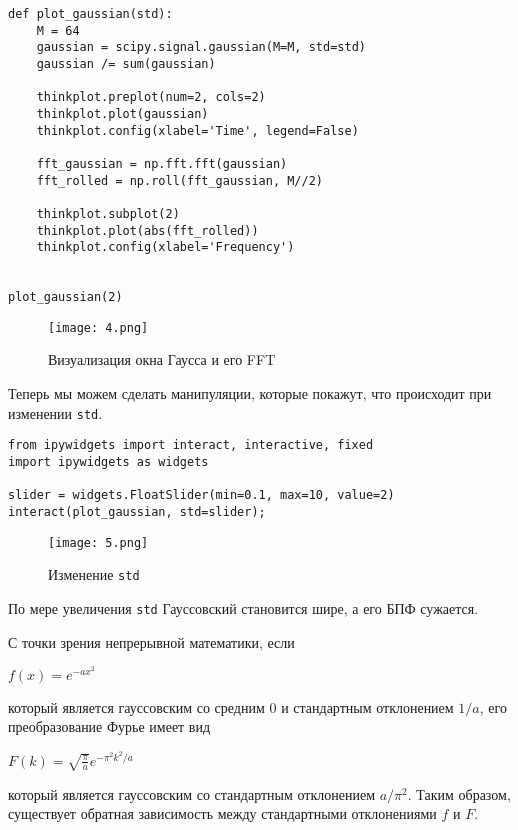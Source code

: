 \documentclass[a4paper,12pt]{report}
\begin{document}
\begin{lstlisting}[caption=Функция \texttt{plot\_gaussian}]
def plot_gaussian(std):
    M = 64
    gaussian = scipy.signal.gaussian(M=M, std=std)
    gaussian /= sum(gaussian)
    
    thinkplot.preplot(num=2, cols=2)
    thinkplot.plot(gaussian)
    thinkplot.config(xlabel='Time', legend=False)

    fft_gaussian = np.fft.fft(gaussian)
    fft_rolled = np.roll(fft_gaussian, M//2)
    
    thinkplot.subplot(2)
    thinkplot.plot(abs(fft_rolled))
    thinkplot.config(xlabel='Frequency')

    
plot_gaussian(2)
\end{lstlisting}

\begin{figure}[H]
        \centering
        \texttt{[image: 4.png]}
        \caption{Визуализация окна Гаусса и его FFT}
        \label{fig:lab8_fig2_4}
\end{figure}

Теперь мы можем сделать манипуляции, которые покажут, что происходит при изменении \texttt{std}.

\begin{lstlisting}[caption=Изменение \texttt{std}]
from ipywidgets import interact, interactive, fixed
import ipywidgets as widgets

slider = widgets.FloatSlider(min=0.1, max=10, value=2)
interact(plot_gaussian, std=slider);
\end{lstlisting}

\begin{figure}[H]
        \centering
        \texttt{[image: 5.png]}
        \caption{Изменение \texttt{std}}
        \label{fig:lab8_fig2_5}
\end{figure}

По мере увеличения \texttt{std} Гауссовский становится шире, а его БПФ сужается.

С точки зрения непрерывной математики, если

$f(x) = e^{-a x^2}$

который является гауссовским со средним 0 и стандартным отклонением $1/a$, его преобразование Фурье имеет вид

$F(k) = \sqrt{\frac{\pi}{a}} e^{-\pi^2 k^2/a}$

который является гауссовским со стандартным отклонением $a / \pi^2$. Таким образом, существует обратная зависимость между стандартными отклонениями $f$ и $F$.
\end{document}
